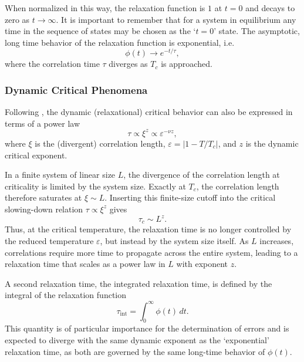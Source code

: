 When normalized in this way, the relaxation function is $1$ at $t = 0$ and decays to zero as $t \to \infty$. It is important to remember that for a system in equilibrium any time in the sequence of states may be chosen as the `$t=0$' state. The asymptotic, long time behavior of the relaxation function is exponential, i.e.
\begin{equation}
\phi(t) \to e^{-t/\tau},
\end{equation}
where the correlation time $\tau$ diverges as $T_c$ is approached.


\subsubsection{Dynamic Critical Phenomena}
Following \cite{LandauMonteCarlo}, the dynamic (relaxational) critical behavior can also be expressed in terms of a power law
\begin{equation}
\tau \propto \xi^{z} \propto \varepsilon^{-\nu z},
\end{equation}
where $\xi$ is the (divergent) correlation length, $\varepsilon = |1 - T/T_c|$, and $z$ is the dynamic critical exponent.

In a finite system of linear size $L$, the divergence of the correlation
length at criticality is limited by the system size.
Exactly at $T_c$, the correlation length therefore saturates at $\xi \sim L$. Inserting this finite-size cutoff into the critical slowing-down relation $\tau \propto \xi^{z}$ gives
\begin{equation}
\tau_c \sim L^{z}.
\end{equation}
Thus, at the critical temperature, the relaxation time is no longer
controlled by the reduced temperature $\varepsilon$, but instead by the
system size itself.
As $L$ increases, correlations require more time to propagate across the entire system, leading to a relaxation time that scales as a power law in $L$ with exponent $z$.

A second relaxation time, the integrated relaxation time, is defined by the integral of the relaxation function
\begin{equation}
\tau_{\mathrm{int}} = \int_{0}^{\infty} \phi(t)\, dt.
\end{equation}
This quantity is of particular importance for the determination of errors and is expected to diverge with the same dynamic exponent as the `exponential' relaxation time, as both are governed by the same long-time behavior of $\phi(t)$.

